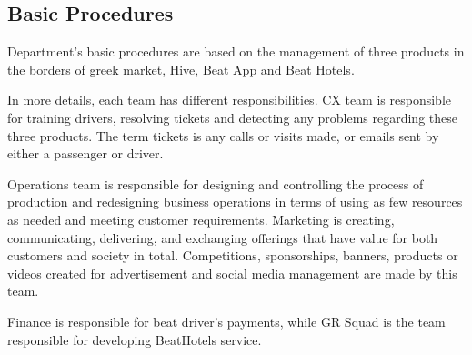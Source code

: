 \subsection{Basic Procedures}
Department's basic procedures are based on the management of three products in the borders of greek market, Hive, Beat App and Beat Hotels.\par
In more details, each team has different responsibilities. CX team is responsible for training drivers, resolving tickets and detecting any problems regarding these three products. The term tickets is any calls or visits made, or emails sent by either a passenger or driver.\par 
Operations team is responsible for designing and controlling the process of production and redesigning business operations in terms of using as few resources as needed and meeting customer requirements. 
Marketing is creating, communicating, delivering, and exchanging offerings that have value for both customers and society in total. Competitions, sponsorships, banners, products or videos created for advertisement and social media management are made by this team.\par
Finance is responsible for beat driver's payments, while GR Squad is the team responsible for developing BeatHotels service.

